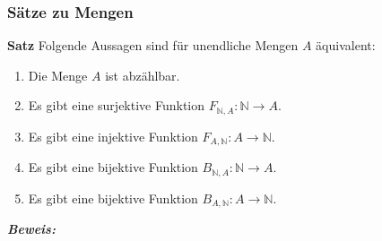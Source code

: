 \subsubsection{Sätze zu Mengen}%
\label{ssub:sätze_zu_mengen}
\textbf{Satz }
Folgende Aussagen sind für unendliche Mengen $A$ äquivalent:
\begin{enumerate}
	\item Die Menge $A$ ist abzählbar.
	\item Es gibt eine surjektive Funktion $F_{\mathbb{N},A}:\mathbb{N}\to A$.
	\item Es gibt eine injektive Funktion $F_{A,\mathbb{N}}:A\to\mathbb{N}$.
	\item Es gibt eine bijektive Funktion $B_{\mathbb{N},A}:\mathbb{N}\to A$.
	\item Es gibt eine bijektive Funktion $B_{A,\mathbb{N}}:A\to\mathbb{N}$.
\end{enumerate}
\textit{\textbf{Beweis: }}
